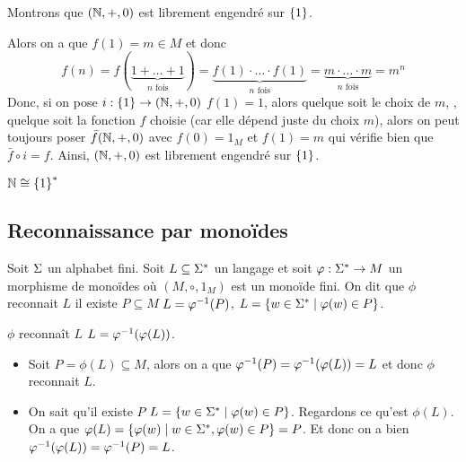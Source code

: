 \begin{exemple}
	Montrons que $(\mathbb{N}, + , 0)$ est librement engendré sur $\left\{1\right\}$.


	Alors on a que $f(1) = m \in M$ et donc 
    $$f(n) =  f(\underbrace{1+\ldots+1}_{n \text{ fois}}) = \underbrace{f(1)\cdot\ldots\cdot f(1)}_{n \text{ fois}} = \underbrace{m\cdot\ldots\cdot m}_{n \text{ fois}} = m^n$$
	Donc, si on pose $i: \left\{1\right\} \to (\mathbb{N}, +, 0)$ \tq $f(1) = 1$, alors quelque soit le choix de $m$, \ie, quelque soit la fonction $f$ choisie (car elle dépend juste du choix $m$), alors
	on peut toujours poser $\bar f (\mathbb{N}, +, 0)$ avec $f(0) = 1_M$ et $f(1) = m$ qui vérifie bien que $\bar f \circ i = f$. Ainsi, $(\mathbb{N}, +, 0)$ est librement engendré sur $\left\{1\right\}$.
\end{exemple}

\begin{remarque}
	$\mathbb{N} \cong \left\{1\right\}^*$
\end{remarque}

\subsection{Reconnaissance par monoïdes}

\begin{definition}
	Soit $\Sigma$ un alphabet fini. Soit $L \subseteq \Sigma^{*}$ un langage et soit $\varphi : \Sigma^{*} \to M$ un morphisme de monoïdes où $(M, \circ, 1_M)$ est un monoïde fini. On dit que
	$\phi$ reconnait $L$ \ssi il existe $P \subseteq M$ \tq $L = \varphi^{-1} (P)$, \cad $L = \left\{w \in \Sigma^{*} \mid \varphi (w) \in P\right\}$.
\end{definition}

\begin{exercice}
	$\phi$ reconnaît $L$ \ssi $L = \varphi^{-1} (\varphi (L))$.
\end{exercice}

\begin{proofI}
	\begin{itemize}
        \item \bimpRL

		      Soit $P = \phi(L) \subseteq M$, alors on a que $\varphi^{-1} (P) = \varphi^{-1} (\varphi (L)) = L$ et donc $\phi$ reconnait $L$.

		\item \bimpLR

		      On sait qu'il existe $P$ \tq $L = \left\{w \in \Sigma^{*} \mid \varphi(w) \in P\right\}$. Regardons ce qu'est $\phi (L)$.
		      On a que $\varphi (L) = \left\{\varphi (w) \mid w \in \Sigma^{*}, \varphi(w) \in P\right\} = P$. Et donc on a bien $\varphi^{-1} (\varphi (L)) = \varphi^{-1} (P) = L$.
	\end{itemize}
\end{proofI}

